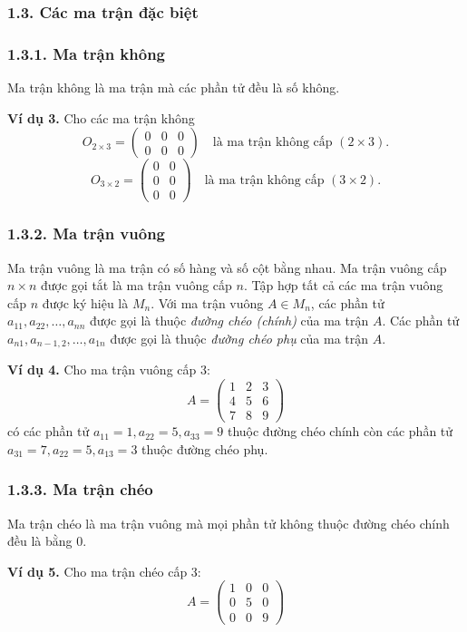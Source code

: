 \subsubsection*{1.3. Các ma trận đặc biệt}
\subsubsection*{1.3.1. Ma trận không}
Ma trận không là ma trận mà các phần tử đều là số không.

\textbf{Ví dụ 3.}
Cho các ma trận không
\[
O_{2 \times 3} = \begin{pmatrix}
0 & 0 & 0 \\
0 & 0 & 0
\end{pmatrix} \quad \text{là ma trận không cấp } (2 \times 3).
\]
\[
O_{3 \times 2} = \begin{pmatrix}
0 & 0 \\
0 & 0 \\
0 & 0
\end{pmatrix} \quad \text{là ma trận không cấp } (3 \times 2).
\]
\subsubsection*{1.3.2. Ma trận vuông}
Ma trận vuông là ma trận có số hàng và số cột bằng nhau. Ma trận vuông cấp \( n \times n \) được gọi tắt là ma trận vuông cấp \( n \). Tập hợp tất cả các ma trận vuông cấp \( n \) được ký hiệu là \( M_n \). Với ma trận vuông \( A \in M_n \), các phần tử \( a_{11}, a_{22}, \ldots, a_{nn} \) được gọi là thuộc \textit{đường chéo (chính)} của ma trận \( A \). Các phần tử \( a_{n1}, a_{n-1,2}, \ldots, a_{1n} \) được gọi là thuộc \textit{đường chéo phụ} của ma trận \( A \).

\textbf{Ví dụ 4.} Cho ma trận vuông cấp 3:
\[
A = \begin{pmatrix}
1 & 2 & 3 \\
4 & 5 & 6 \\
7 & 8 & 9
\end{pmatrix}
\]
có các phần tử \( a_{11} = 1, a_{22} = 5, a_{33} = 9 \) thuộc đường chéo chính còn các phần tử \( a_{31} = 7, a_{22} = 5, a_{13} = 3 \) thuộc đường chéo phụ.

\subsubsection*{1.3.3. Ma trận chéo}
Ma trận chéo là ma trận vuông mà mọi phần tử không thuộc đường chéo chính đều là bằng 0.

\textbf{Ví dụ 5.} Cho ma trận chéo cấp 3:
\[
A = \begin{pmatrix}
1 & 0 & 0 \\
0 & 5 & 0 \\
0 & 0 & 9
\end{pmatrix}
\]

